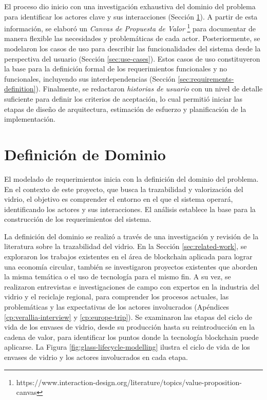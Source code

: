 El proceso dio inicio con una investigación exhaustiva del dominio del problema para identificar los actores clave y sus interacciones (Sección \ref{sec:domain-definition}). A partir de esta información, se elaboró un \textit{Canvas de Propuesta de Valor} \footnote{https://www.interaction-design.org/literature/topics/value-proposition-canvas} para documentar de manera flexible las necesidades y problemáticas de cada actor. Posteriormente, se modelaron los casos de uso para describir las funcionalidades del sistema desde la perspectiva del usuario (Sección \ref{sec:use-cases}). Estos casos de uso constituyeron la base para la definición formal de los requerimientos funcionales y no funcionales, incluyendo sus interdependencias (Sección \ref{sec:requirements-definition}). Finalmente, se redactaron \textit{historias de usuario} con un nivel de detalle suficiente para definir los criterios de aceptación, lo cual permitió iniciar las etapas de diseño de arquitectura, estimación de esfuerzo y planificación de la implementación.

\section{Definición de Dominio}
\label{sec:domain-definition}

El modelado de requerimientos inicia con la definición del dominio del problema. En el contexto de este proyecto, que busca la trazabilidad y valorización del vidrio, el objetivo es comprender el entorno en el que el sistema operará, identificando los actores y sus interacciones. El análisis establece la base para la construcción de los requerimientos del sistema.

La definición del dominio se realizó a través de una investigación y revisión de la literatura sobre la trazabilidad del vidrio. En la Sección \ref{sec:related-work}, se exploraron los trabajos existentes en el área de blockchain aplicada para lograr una economía circular, también se investigaron proyectos existentes que aborden la misma temática o el uso de tecnología para el mismo fin. A su vez, se realizaron entrevistas e investigaciones de campo con expertos en la industria del vidrio y el reciclaje regional, para comprender los procesos actuales, las problemáticas y las expectativas de los actores involucrados (Apéndices \ref{cp:verallia-interview} y \ref{cp:europe-trip}). Se examinaron las etapas del ciclo de vida de los envases de vidrio, desde su producción hasta su reintroducción en la cadena de valor, para identificar los puntos donde la tecnología blockchain puede aplicarse. La Figura \ref{fig:glass-lifecycle-modelling} ilustra el ciclo de vida de los envases de vidrio y los actores involucrados en cada etapa.


